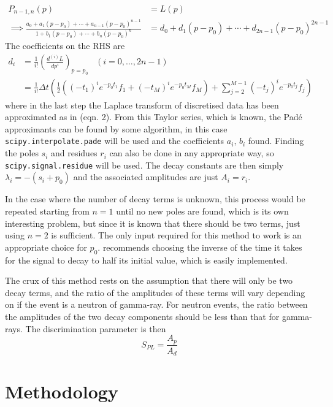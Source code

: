 \documentclass[11pt]{article}
\numberwithin{equation}{section}
\numberwithin{figure}{section}
\numberwithin{table}{section}
\begin{document}
\begin{align}
    P_{n-1,n}(p)&=L(p)\\
    \implies \frac{a_0+a_1(p-p_0)+\dotsi+a_{n-1}(p-p_0)^{n-1}}{1+b_1(p-p_0)+\dotsi+b_n(p-p_0)^n}&=d_0+d_1(p-p_0)+\dotsi+d_{2n-1}(p-p_0)^{2n-1}\label{eqn:pade approximant}
\end{align}
The coefficients on the RHS are 
\begin{align}
    d_i&=\frac{1}{i!}\left(\frac{d^{(i)}L}{dp^{i}}\right)_{p=p_0}\;\;\;(i=0,\dots,2n-1)\\
    &=\frac{1}{i!}\Delta t\left(\frac{1}{2}((-t_1)^ie^{-p_0t_1}f_1+(-t_M)^ie^{-p_0t_M}f_M)+\sum_{j=2}^{M-1}(-t_j)^ie^{-p_0t_j}f_j \right)
\end{align}
where in the last step the Laplace transform of discretised data has been approximated as in \cite{Hellen-Pade} (eqn. 2). From this Taylor series, which is known, the Pad\'e approximants can be found by some algorithm, in this case \texttt{scipy.interpolate.pade} will be used and the coefficients $a_i,\, b_i$ found. Finding the poles $s_i$ and residues $r_i$ can also be done in any appropriate way, so \texttt{scipy.signal.residue} will be used. The decay constants are then simply $\lambda_i=-(s_i+p_0)$ and the associated amplitudes are just $A_i=r_i$.
\par In the case where the number of decay terms is unknown, this process would be repeated starting from $n=1$ until no new poles are found, which is its own interesting problem, but since it is known that there should be two terms, just using $n=2$ is sufficient. The only input required for this method to work is an appropriate choice for $p_0$. \cite{Hellen-Pade} recommends choosing the inverse of the time it takes for the signal to decay to half its initial value, which is easily implemented. 
\par The crux of this method rests on the assumption that there will only be two decay terms, and the ratio of the amplitudes of these terms will vary depending on if the event is a neutron of gamma-ray. For neutron events, the ratio between the amplitudes of the two decay components should be less than that for gamma-rays. The discrimination parameter is then
\begin{equation}
    S_{PL}=\frac{A_p}{A_d}
    \label{eqn:PL parameter}
\end{equation}

\section{Methodology}\label{sec:Methodology}
\end{document}
